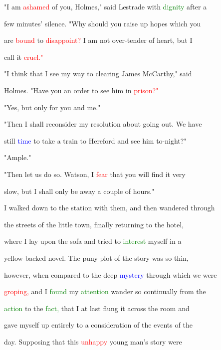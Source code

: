  "I am \textcolor{red}{ashamed} of you, Holmes," said Lestrade with \textcolor{green}{dignity} after a

 few minutes' silence. "Why should you raise up \textcolor{BurntOrange}{hopes} which you

 are \textcolor{red}{bound} to \textcolor{red}{disappoint?} I am not over-tender of heart, but I

 call it \textcolor{red}{cruel."}



 "I think that I see my way to clearing James McCarthy," said

 Holmes. "Have you an order to see him in \textcolor{red}{prison?"}



 "Yes, but only for you and me."



 "Then I shall reconsider my resolution about going out. We have

 still \textcolor{blue}{time} to take a train to Hereford and see him to-night?"



 "Ample."



 "Then let us do so. Watson, I \textcolor{red}{fear} that you will find it very

 slow, but I shall only be away a couple of hours."



 I walked down to the station with them, and then wandered through

 the streets of the little town, \textcolor{BurntOrange}{finally} returning to the hotel,

 where I lay upon the sofa and tried to \textcolor{green}{interest} myself in a

 yellow-backed novel. The puny plot of the story was so thin,

 however, when compared to the deep \textcolor{blue}{mystery} through which we were

 \textcolor{red}{groping,} and I \textcolor{green}{found} my \textcolor{green}{attention} wander so continually from the

 \textcolor{green}{action} to the \textcolor{green}{fact,} that I at last flung it across the room and

 gave myself up entirely to a consideration of the events of the

 day. Supposing that this \textcolor{red}{unhappy} \textcolor{BurntOrange}{young} man's story were

